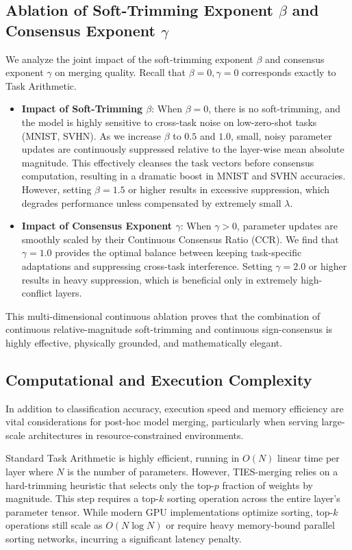 \documentclass{article}
\theoremstyle{plain}
\theoremstyle{definition}
\theoremstyle{remark}
\begin{document}
\subsection{Ablation of Soft-Trimming Exponent $\beta$ and Consensus Exponent $\gamma$}
We analyze the joint impact of the soft-trimming exponent $\beta$ and consensus exponent $\gamma$ on merging quality. Recall that $\beta = 0, \gamma = 0$ corresponds exactly to Task Arithmetic.
\begin{itemize}
    \item \textbf{Impact of Soft-Trimming $\beta$}: When $\beta = 0$, there is no soft-trimming, and the model is highly sensitive to cross-task noise on low-zero-shot tasks (MNIST, SVHN). As we increase $\beta$ to $0.5$ and $1.0$, small, noisy parameter updates are continuously suppressed relative to the layer-wise mean absolute magnitude. This effectively cleanses the task vectors before consensus computation, resulting in a dramatic boost in MNIST and SVHN accuracies. However, setting $\beta = 1.5$ or higher results in excessive suppression, which degrades performance unless compensated by extremely small $\lambda$.
    \item \textbf{Impact of Consensus Exponent $\gamma$}: When $\gamma > 0$, parameter updates are smoothly scaled by their Continuous Consensus Ratio (CCR). We find that $\gamma = 1.0$ provides the optimal balance between keeping task-specific adaptations and suppressing cross-task interference. Setting $\gamma = 2.0$ or higher results in heavy suppression, which is beneficial only in extremely high-conflict layers.
\end{itemize}
This multi-dimensional continuous ablation proves that the combination of continuous relative-magnitude soft-trimming and continuous sign-consensus is highly effective, physically grounded, and mathematically elegant.

\subsection{Computational and Execution Complexity}
In addition to classification accuracy, execution speed and memory efficiency are vital considerations for post-hoc model merging, particularly when serving large-scale architectures in resource-constrained environments.

Standard Task Arithmetic is highly efficient, running in $O(N)$ linear time per layer where $N$ is the number of parameters. However, TIES-merging relies on a hard-trimming heuristic that selects only the top-$p$ fraction of weights by magnitude. This step requires a top-$k$ sorting operation across the entire layer's parameter tensor. While modern GPU implementations optimize sorting, top-$k$ operations still scale as $O(N \log N)$ or require heavy memory-bound parallel sorting networks, incurring a significant latency penalty.
\end{document}
